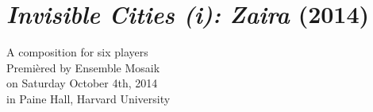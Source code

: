 \chapter{\emph{Invisible Cities (i): Zaira} (2014)}

\begin{singlespacing}
\begin{flushright}
A composition for six players \\
\vspace*{\baselineskip}
Premi\`{e}red by Ensemble Mosaik \\
on Saturday October 4th, 2014 \\
in Paine Hall, Harvard University
\end{flushright}
\end{singlespacing}

